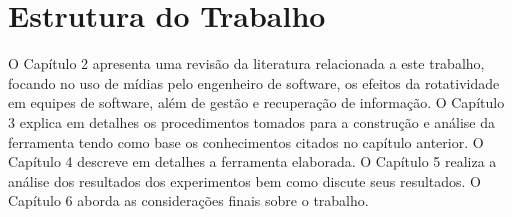 \section{Estrutura do Trabalho}

O Capítulo 2 apresenta uma revisão da literatura relacionada a este trabalho, focando no uso de mídias pelo engenheiro de software, os efeitos da rotatividade em equipes de software, além de gestão e recuperação de informação. O Capítulo 3 explica em detalhes os procedimentos tomados para a construção e análise da ferramenta tendo como base os conhecimentos citados no capítulo anterior. O Capítulo 4 descreve em detalhes a ferramenta elaborada. O Capítulo 5 realiza a análise dos resultados dos experimentos bem como discute seus resultados. O Capítulo 6 aborda as considerações finais sobre o trabalho.
